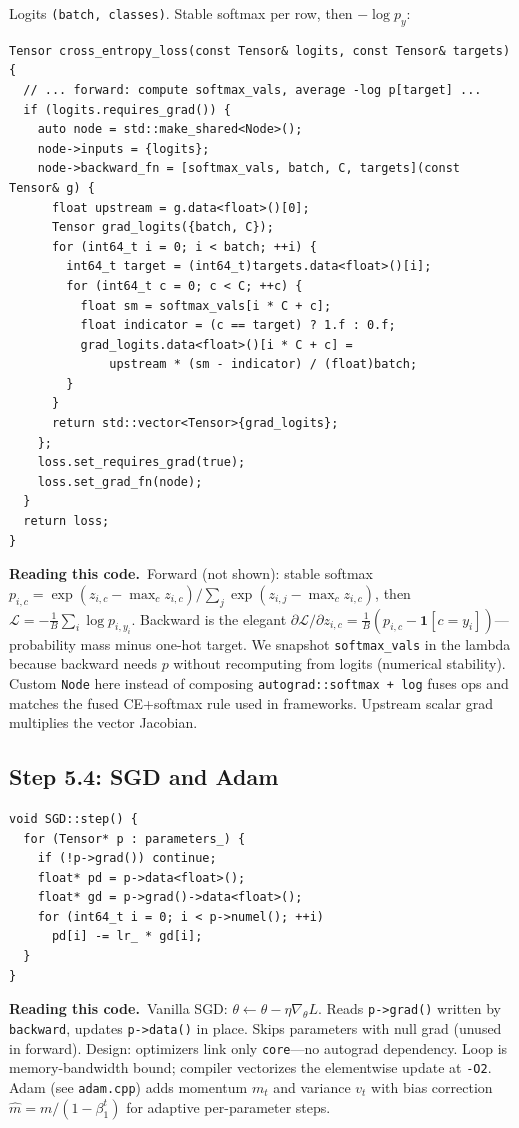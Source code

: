 \documentclass[11pt,a4paper]{article}
\newcommand{\explain}{\par\smallskip\noindent}
\newcommand{\exhead}{\textbf{Reading this code.}\ }
\begin{document}
Logits \texttt{(batch, classes)}. Stable softmax per row, then $-\log p_y$:

\begin{lstlisting}[style=cpp]
Tensor cross_entropy_loss(const Tensor& logits, const Tensor& targets) {
  // ... forward: compute softmax_vals, average -log p[target] ...
  if (logits.requires_grad()) {
    auto node = std::make_shared<Node>();
    node->inputs = {logits};
    node->backward_fn = [softmax_vals, batch, C, targets](const Tensor& g) {
      float upstream = g.data<float>()[0];
      Tensor grad_logits({batch, C});
      for (int64_t i = 0; i < batch; ++i) {
        int64_t target = (int64_t)targets.data<float>()[i];
        for (int64_t c = 0; c < C; ++c) {
          float sm = softmax_vals[i * C + c];
          float indicator = (c == target) ? 1.f : 0.f;
          grad_logits.data<float>()[i * C + c] =
              upstream * (sm - indicator) / (float)batch;
        }
      }
      return std::vector<Tensor>{grad_logits};
    };
    loss.set_requires_grad(true);
    loss.set_grad_fn(node);
  }
  return loss;
}
\end{lstlisting}
\explain\exhead Forward (not shown): stable softmax $p_{i,c} = \exp(z_{i,c} - \max_c z_{i,c}) /
\sum_j \exp(z_{i,j} - \max_c z_{i,c})$, then $\mathcal{L} = -\frac{1}{B}\sum_i \log p_{i,y_i}$.
Backward is the elegant $\partial \mathcal{L}/\partial z_{i,c} = \frac{1}{B}(p_{i,c} -
\mathbf{1}[c=y_i])$---probability mass minus one-hot target. We snapshot \texttt{softmax\_vals}
in the lambda because backward needs $p$ without recomputing from logits (numerical stability).
Custom \texttt{Node} here instead of composing \texttt{autograd::softmax + log} fuses ops and
matches the fused CE+softmax rule used in frameworks. Upstream scalar grad multiplies the vector
Jacobian.

\subsection{Step 5.4: SGD and Adam}

\begin{lstlisting}[style=cpp]
void SGD::step() {
  for (Tensor* p : parameters_) {
    if (!p->grad()) continue;
    float* pd = p->data<float>();
    float* gd = p->grad()->data<float>();
    for (int64_t i = 0; i < p->numel(); ++i)
      pd[i] -= lr_ * gd[i];
  }
}
\end{lstlisting}
\explain\exhead Vanilla SGD: $\theta \leftarrow \theta - \eta \nabla_\theta L$. Reads
\texttt{p->grad()} written by \texttt{backward}, updates \texttt{p->data()} in place. Skips
parameters with null grad (unused in forward). Design: optimizers link only \texttt{core}---no
autograd dependency. Loop is memory-bandwidth bound; compiler vectorizes the elementwise
update at \texttt{-O2}. Adam (see \texttt{adam.cpp}) adds momentum $m_t$ and variance $v_t$ with
bias correction $\hat{m} = m/(1-\beta_1^t)$ for adaptive per-parameter steps.
\end{document}

